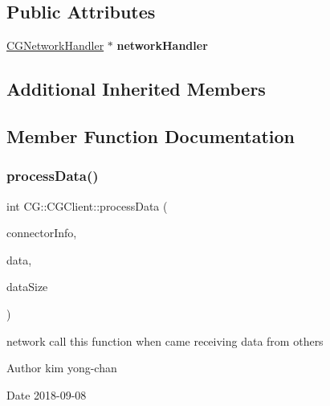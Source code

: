 \subsection*{Public Attributes}
\begin{DoxyCompactItemize}
\item 
\mbox{\label{class_c_g_1_1_c_g_client_ab3946b15ed83de702a29a7b16de2c9de}} 
\mbox{\hyperlink{class_c_g_1_1_c_g_network_handler}{C\+G\+Network\+Handler}} $\ast$ {\bfseries network\+Handler}
\end{DoxyCompactItemize}
\subsection*{Additional Inherited Members}


\subsection{Member Function Documentation}
\mbox{\label{class_c_g_1_1_c_g_client_a88087f4fdc6e07c8a252d9abe67d9f8b}} 
\subsubsection{\texorpdfstring{process\+Data()}{processData()}}
{\footnotesize\ttfamily int C\+G\+::\+C\+G\+Client\+::process\+Data (\begin{DoxyParamCaption}\item[{\mbox{\hyperlink{class_c_g_1_1_connector_info}{Connector\+Info}} $\ast$}]{connector\+Info,  }\item[{char $\ast$}]{data,  }\item[{int}]{data\+Size }\end{DoxyParamCaption})\hspace{0.3cm}{\ttfamily [virtual]}}



network call this function when came receiving data from others 

\begin{DoxyAuthor}{Author}
kim yong-\/chan 
\end{DoxyAuthor}
\begin{DoxyDate}{Date}
2018-\/09-\/08 
\end{DoxyDate}

